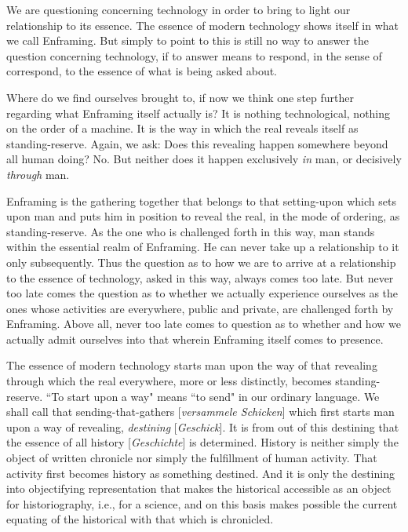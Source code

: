 We are questioning concerning technology in order to bring to light our relationship to its essence. The essence of modern technology shows itself in what we call Enframing. But simply to point to this is still no way to answer the question concerning technology, if to answer means to respond, in the sense of correspond, to the essence of what is being asked about.

Where do we find ourselves brought to, if now we think one step further regarding what Enframing itself actually is? It is nothing technological, nothing on the order of a machine. It is the way in which the real reveals itself as standing-reserve. Again, we ask: Does this revealing happen somewhere beyond all human doing? No. But neither does it happen exclusively \textit{in} man, or decisively \textit{through} man.

Enframing is the gathering together that belongs to that setting-upon which sets upon man and puts him in position to reveal the real, in the mode of ordering, as standing-reserve. As the one who is challenged forth in this way, man stands within the essential realm of Enframing. He can never take up a relationship to it only subsequently. Thus the question as to how we are to arrive at a relationship to the essence of technology, asked in this way, always comes too late. But never too late comes the question as to whether we actually experience ourselves as the ones whose activities are everywhere, public and private, are challenged forth by Enframing. Above all, never too late comes to question as to whether and how we actually admit ourselves into that wherein Enframing itself comes to presence.

The essence of modern technology starts man upon the way of that revealing through which the real everywhere, more or less distinctly, becomes standing-reserve. ``To start upon a way" means ``to send" in our ordinary language. We shall call that sending-that-gathers [\textit{versammele Schicken}] which first starts man upon a way of revealing, \textit{destining} [\textit{Geschick}]. It is from out of this destining that the essence of all history [\textit{Geschichte}] is determined. History is neither simply the object of written chronicle nor simply the fulfillment of human activity. That activity first becomes history as something destined. And it is only the destining into objectifying representation that makes the historical accessible as an object for historiography, i.e., for a science, and on this basis makes possible the current equating of the historical with that which is chronicled.

